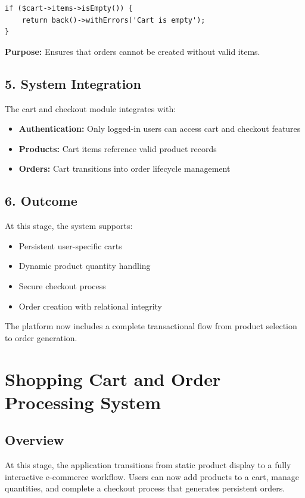 \documentclass[12pt,a4paper]{article}
\begin{document}
\begin{verbatim}
if ($cart->items->isEmpty()) {
    return back()->withErrors('Cart is empty');
}
\end{verbatim}

\textbf{Purpose:} Ensures that orders cannot be created without valid items.

\subsection{5. System Integration}

The cart and checkout module integrates with:

\begin{itemize}[noitemsep]
    \item \textbf{Authentication:} Only logged-in users can access cart and checkout features
    \item \textbf{Products:} Cart items reference valid product records
    \item \textbf{Orders:} Cart transitions into order lifecycle management
\end{itemize}

\subsection{6. Outcome}

At this stage, the system supports:

\begin{itemize}[noitemsep]
    \item Persistent user-specific carts
    \item Dynamic product quantity handling
    \item Secure checkout process
    \item Order creation with relational integrity
\end{itemize}

The platform now includes a complete transactional flow from product selection to order generation.


\section{Shopping Cart and Order Processing System}

\subsection{Overview}
At this stage, the application transitions from static product display to a fully interactive e-commerce workflow. Users can now add products to a cart, manage quantities, and complete a checkout process that generates persistent orders.
\end{document}
